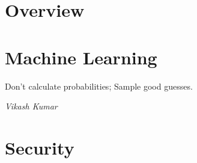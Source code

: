 \documentclass[preprint,12pt]{elsarticle}
\begin{document}



\part{Overview}







 




\newpage
\part{Machine Learning}
\epigraph{Don't calculate probabilities; 
  Sample good guesses.}{\textit{Vikash Kumar \cite{Mansinghka:2009}}}



\newpage
\part{Security}










\end{document}
